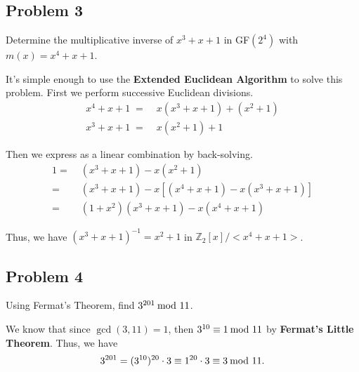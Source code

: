 \documentclass[../hw_sols.tex]{subfiles}
\begin{document}
\subsection*{Problem 3}

Determine the multiplicative inverse of $x^3 + x + 1$ in GF$(2^4)$ with 
$m(x) = x^4 + x + 1$.

\begin{solution}

It's simple enough to use the \textbf{Extended Euclidean Algorithm} to solve 
this problem. First we perform successive Euclidean divisions.
\begin{align*}
	x^4 + x + 1 \; =& \; x(x^3 + x + 1) + (x^2 + 1) \\
	x^3 + x + 1 \; =& \; x(x^2+ 1) + 1
\end{align*}

Then we express as a linear combination by back-solving.
\begin{align*}
	1 =& \; (x^3 + x + 1) - x(x^2 + 1) \\
	=& \; (x^3 + x + 1) - x[(x^4 + x+ 1) - x(x^3 + x + 1)] \\
	=& \; (1 + x^2)(x^3 + x + 1) - x(x^4 + x + 1)
\end{align*}

\noindent Thus, we have $(x^3+x+1)^{-1} = x^2 + 1$ in 
$\mathbb{Z}_2[x]/<x^4+x+1>$.

\end{solution}


\newpage



\subsection*{Problem 4}

Using Fermat's Theorem, find $3^{201} \tmod{11}$.

\begin{solution}
We know that since $\gcd(3,11) = 1$, then $3^{10} \equiv 1 \tmod{11}$ by 
\textbf{Fermat's Little Theorem}. Thus, we have 
	$$3^{201} = (3^{10})^{20} \cdot 3 
	\equiv 1^{20} \cdot 3 \equiv 3 \tmod{11}.$$
\end{solution}


\newpage
\end{document}
